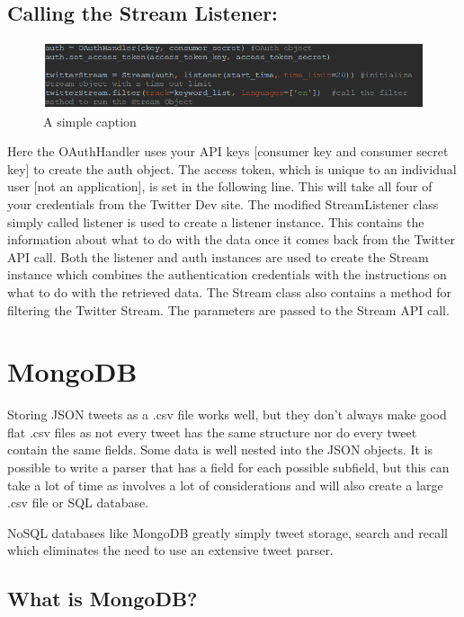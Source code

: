 \subsection{Calling the Stream Listener:}

\begin{figure}[ht!]
	\centering
	\includegraphics[width=150mm]{code6.png}
	\caption{A simple caption \label{overflow}}
\end{figure}

Here the OAuthHandler uses your API keys [consumer key and consumer secret key] to create the auth object. The access token, which is unique to an individual user [not an application], is set in the following line. This will take all four of your credentials from the Twitter Dev site. The modified StreamListener class simply called listener is used to create a listener instance. This contains the information about what to do with the data once it comes back from the Twitter API call. Both the listener and auth instances are used to create the Stream instance which combines the authentication credentials with the instructions on what to do with the retrieved data. The Stream class also contains a method for filtering the Twitter Stream. The parameters are passed to the Stream API call.

\section{MongoDB}

Storing JSON tweets as a .csv file works well, but they don’t always make good flat .csv files as not every tweet has the same structure nor do every tweet contain the same fields. Some data is well nested into the JSON objects. It is possible to write a parser that has a field for each possible subfield, but this can take a lot of time as involves a lot of considerations and will also create a large .csv file or SQL database.

NoSQL databases like MongoDB greatly simply tweet storage, search and recall which eliminates the need to use an extensive tweet parser.

\subsection{What is MongoDB?}

